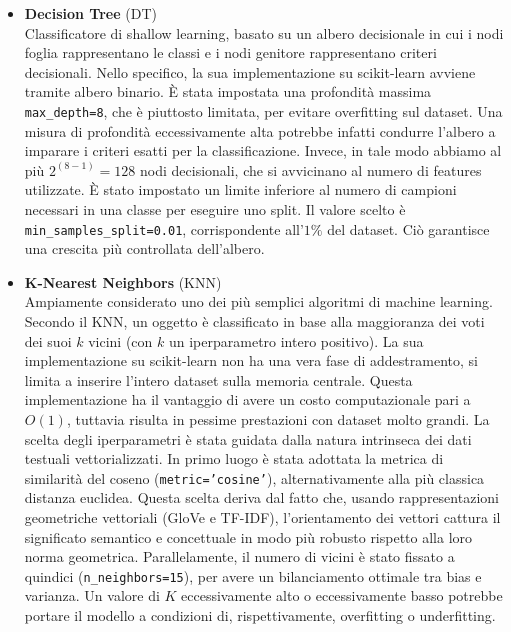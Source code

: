 \documentclass[12pt, a4paper, twoside]{article}
\numberwithin{table}{section}
\begin{document}
    \begin{itemize}
    
        \item \textbf{Decision Tree} (DT) \\
        Classificatore di shallow learning, basato su un albero decisionale in cui i nodi foglia rappresentano le classi 
        e i nodi genitore rappresentano criteri decisionali. Nello specifico, la sua implementazione su scikit-learn 
        avviene tramite albero binario. È stata impostata una profondità massima \texttt{max\_depth=8}, che è piuttosto 
        limitata, per evitare overfitting sul dataset. Una misura di profondità eccessivamente alta 
        potrebbe infatti condurre l'albero a imparare i criteri esatti per la classificazione. Invece, in tale modo 
        abbiamo al più $2^{(8-1)}=128$ nodi decisionali, che si avvicinano al numero di features utilizzate. È stato 
        impostato un limite inferiore al numero di campioni necessari in una classe per eseguire uno split. Il valore 
        scelto è \texttt{min\_samples\_split=0.01}, corrispondente all'$1\%$ del dataset. Ciò garantisce una crescita 
        più controllata dell'albero.
        
        \item \textbf{K-Nearest Neighbors} (KNN) \\
        Ampiamente considerato uno dei più semplici algoritmi di machine learning. Secondo il KNN, un oggetto è classificato
        in base alla maggioranza dei voti dei suoi $k$ vicini (con $k$ un iperparametro intero positivo). La sua implementazione
        su scikit-learn non ha una vera fase di addestramento, si limita a inserire l'intero dataset sulla memoria centrale.
        Questa implementazione ha il vantaggio di avere un costo computazionale pari a $O(1)$, tuttavia risulta in pessime 
        prestazioni con dataset molto grandi.
        La scelta degli iperparametri è stata guidata dalla natura intrinseca dei dati testuali vettorializzati. In primo
        luogo è stata adottata la metrica di similarità del coseno (\texttt{metric='cosine'}), alternativamente alla più classica
        distanza euclidea. Questa scelta deriva dal fatto che, usando rappresentazioni geometriche vettoriali (GloVe e TF-IDF),
        l'orientamento dei vettori cattura il significato semantico e concettuale in modo più robusto rispetto alla loro
        norma geometrica. Parallelamente, il numero di vicini è stato fissato a quindici (\texttt{n\_neighbors=15}), per avere
        un bilanciamento ottimale tra bias e varianza. Un valore di $K$ eccessivamente alto o eccessivamente basso potrebbe portare
        il modello a condizioni di, rispettivamente, overfitting o underfitting. 


\end{itemize}
\end{document}
